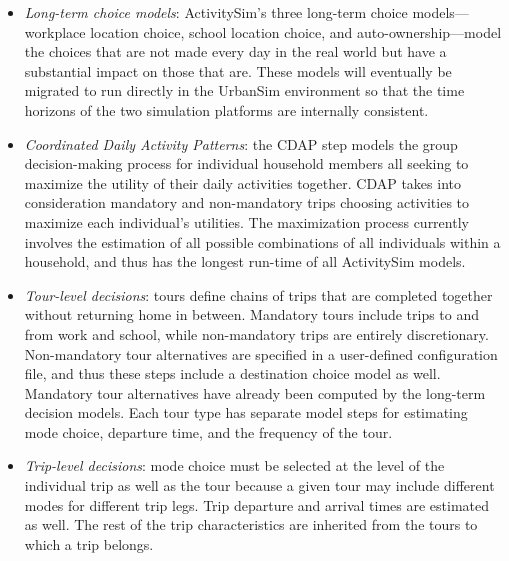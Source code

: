 \begin{itemize}
    \item \emph{Long-term choice models}: ActivitySim's three long-term choice models---workplace location choice, school location choice, and auto-ownership---model the choices that are not made every day in the real world but have a substantial impact on those that are. These models will eventually be migrated to run directly in the UrbanSim environment so that the time horizons of the two simulation platforms are internally consistent.
    
    \item \emph{Coordinated Daily Activity Patterns}: the CDAP step models the group decision-making process for individual household members all seeking to maximize the utility of their daily activities together. CDAP takes into consideration mandatory and non-mandatory trips choosing activities to maximize each individual's utilities. The maximization process currently involves the estimation of all possible combinations of all individuals within a household, and thus has the longest run-time of all ActivitySim models.
    
    \item \emph{Tour-level decisions}: tours define chains of trips that are completed together without returning home in between. Mandatory tours include trips to and from work and school, while non-mandatory trips are entirely discretionary. Non-mandatory tour alternatives are specified in a user-defined configuration file, and thus these steps include a destination choice model as well. Mandatory tour alternatives have already been computed by the long-term decision models. Each tour type has separate model steps for estimating mode choice, departure time, and the frequency of the tour.
    
    \item \emph{Trip-level decisions}: mode choice must be selected at the level of the individual trip as well as the tour because a given tour may include different modes for different trip legs. Trip departure and arrival times are estimated as well. The rest of the trip characteristics are inherited from the tours to which a trip belongs. 
\end{itemize}

